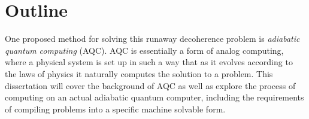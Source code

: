 \section{Outline}
One proposed method for solving this runaway decoherence problem is \emph{adiabatic quantum computing} (AQC).\cite{farhi}  AQC is essentially a form of analog computing, where a physical system is set up in such a way that as it evolves according to the laws of physics it naturally computes the solution to a problem.  This dissertation will cover the background of AQC as well as explore the process of computing on an actual adiabatic quantum computer, including the requirements of compiling problems into a specific machine solvable form.
